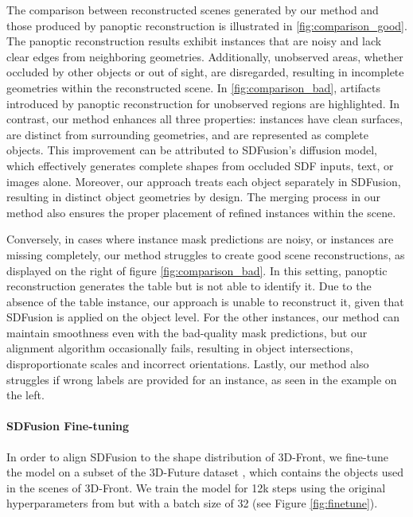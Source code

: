 The comparison between reconstructed scenes generated by our method and those produced by panoptic reconstruction is illustrated in \ref{fig:comparison_good}.
The panoptic reconstruction results exhibit instances that are noisy and lack clear edges from neighboring geometries.
Additionally, unobserved areas, whether occluded by other objects or out of sight, are disregarded, resulting in incomplete geometries within the reconstructed scene.
In \ref{fig:comparison_bad}, artifacts introduced by panoptic reconstruction for unobserved regions are highlighted.
In contrast, our method enhances all three properties: instances have clean surfaces, are distinct from surrounding geometries, and are represented as complete objects.
This improvement can be attributed to SDFusion's diffusion model, which effectively generates complete shapes from occluded SDF inputs, text, or images alone.
Moreover, our approach treats each object separately in SDFusion, resulting in distinct object geometries by design. The merging process in our method also ensures the proper placement of refined instances within the scene.

Conversely, in cases where instance mask predictions are noisy, or instances are missing completely, our method struggles to create good scene reconstructions, as displayed on the right of figure \ref{fig:comparison_bad}. In this setting, panoptic reconstruction generates the table but is not able to identify it. Due to the absence of the table instance, our approach is unable to reconstruct it, given that SDFusion is applied on the object level. For the other instances, our method can maintain smoothness even with the bad-quality mask predictions, but our alignment algorithm occasionally fails, resulting in object intersections, disproportionate scales and incorrect orientations. Lastly, our method also struggles if wrong labels are provided for an instance, as seen in the example on the left.



\paragraph{SDFusion Fine-tuning}
In order to align SDFusion to the shape distribution of 3D-Front, we fine-tune the model on a subset of the 3D-Future dataset \citep{fu20213e}, which contains the objects used in the scenes of 3D-Front.
We train the model for 12k steps using the original hyperparameters from \citet{cheng2023sdfusion} but with a batch size of 32 (see Figure \ref{fig:finetune}). 


